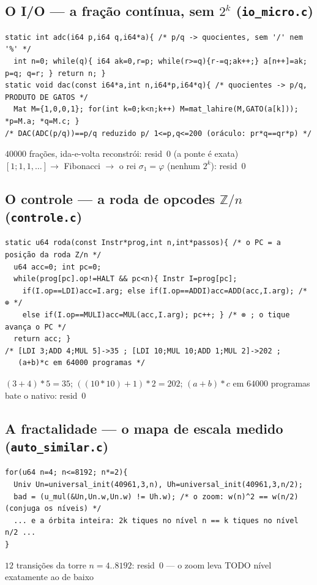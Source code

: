 \documentclass[11pt,a4paper]{article}
\begin{document}
\subsection{O I/O --- a fração contínua, sem $2^{k}$ (\texttt{io\_micro.c})}
\begin{lstlisting}
static int adc(i64 p,i64 q,i64*a){ /* p/q -> quocientes, sem '/' nem '%' */
  int n=0; while(q){ i64 ak=0,r=p; while(r>=q){r-=q;ak++;} a[n++]=ak; p=q; q=r; } return n; }
static void dac(const i64*a,int n,i64*p,i64*q){ /* quocientes -> p/q, PRODUTO DE GATOS */
  Mat M={1,0,0,1}; for(int k=0;k<n;k++) M=mat_lahire(M,GATO(a[k])); *p=M.a; *q=M.c; }
/* DAC(ADC(p/q))==p/q reduzido p/ 1<=p,q<=200 (oráculo: pr*q==qr*p) */
\end{lstlisting}
$40000$ frações, ida-e-volta reconstrói: resid~$0$ (a ponte é exata)\\
$[1;1,1,\ldots]\to$ Fibonacci $\to$ o rei $\sigma_{1}=\varphi$ (nenhum $2^{k}$): resid~$0$

\subsection{O controle --- a roda de opcodes $\mathbb{Z}/n$ (\texttt{controle.c})}
\begin{lstlisting}
static u64 roda(const Instr*prog,int n,int*passos){ /* o PC = a posição da roda Z/n */
  u64 acc=0; int pc=0;
  while(prog[pc].op!=HALT && pc<n){ Instr I=prog[pc];
    if(I.op==LDI)acc=I.arg; else if(I.op==ADDI)acc=ADD(acc,I.arg); /* ⊕ */
    else if(I.op==MULI)acc=MUL(acc,I.arg); pc++; } /* ⊗ ; o tique avança o PC */
  return acc; }
/* [LDI 3;ADD 4;MUL 5]->35 ; [LDI 10;MUL 10;ADD 1;MUL 2]->202 ;
   (a+b)*c em 64000 programas */
\end{lstlisting}
$(3+4)*5=35$; $((10*10)+1)*2=202$; $(a+b)*c$ em $64000$ programas bate o nativo: resid~$0$

\subsection{A fractalidade --- o mapa de escala medido (\texttt{auto\_similar.c})}
\begin{lstlisting}
for(u64 n=4; n<=8192; n*=2){
  Univ Un=universal_init(40961,3,n), Uh=universal_init(40961,3,n/2);
  bad = (u_mul(&Un,Un.w,Un.w) != Uh.w); /* o zoom: w(n)^2 == w(n/2) (conjuga os níveis) */
  ... e a órbita inteira: 2k tiques no nível n == k tiques no nível n/2 ...
}
\end{lstlisting}
$12$ transições da torre $n=4..8192$: resid~$0$ --- o zoom leva TODO nível exatamente ao de baixo
\end{document}
